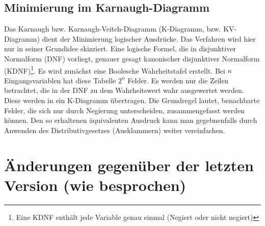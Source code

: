 \documentclass[a4paper, 11pt]{book}
\begin{document}
{\section{Minimierung im Karnaugh-Diagramm}\label{Min_K_Dia} 
Das Karnaugh bzw. Karnaugh-Veitch-Diagramm (K-Diagramm, bzw. KV-Diagramm) dient der Minimierung logischer Ausdrücke. Das Verfahren wird hier nur in seiner Grundidee skizziert. Eine logische Formel, die in disjunktiver Normalform (DNF) vorliegt, genauer gesagt kanonischer disjunktiver Normalform (KDNF)\footnote{Eine KDNF enthält jede Variable genau einmal (Negiert oder nicht negiert)}. Es wird zunächst eine Boolesche Wahrheitstafel erstellt. Bei $ n $ Eingangsvariablen hat diese Tabelle $ 2^{n} $ Felder. Es werden nur die Zeilen betrachtet, die in der DNF zu dem Wahrheitswert wahr ausgewertet werden. Diese werden in ein K-Diagramm übertragen.  Die Grundregel lautet, benachbarte Felder, die sich nur durch Negierung unterscheiden, zusammengefasst werden können. Den so erhaltenen äquivalenten Ausdruck kann man gegebnenfalls durch Anwenden des Distributivgesetzes (Ausklammern) weiter vereinfachen.
}
\chapter{Änderungen gegenüber der letzten Version (wie besprochen)}
\end{document}
